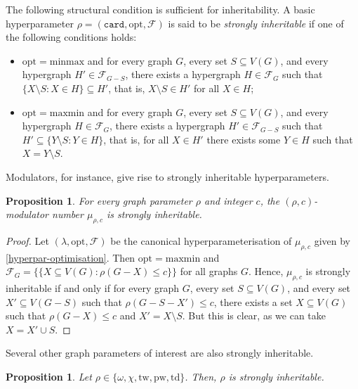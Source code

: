 \documentclass[11pt]{article}
\newcommand{\td}{\mathrm{td}}
\newcommand{\tw}{\mathrm{tw}}
\newcommand{\maxmin}{\mathrm{maxmin}}
\newcommand{\pw}{\mathrm{pw}}
\newcommand{\opt}{\mathrm{opt}}
\newcommand{\rhocm}{\mu_{\rho,c}}
\theoremstyle{plain}
\newtheorem{proposition}[theorem]{Proposition}
\theoremstyle{definition}
\theoremstyle{remark}
\numberwithin{equation}{section}
\begin{document}
The following structural condition is sufficient for inheritability.
A basic hyperparameter $\rho=(\mathtt{card},\opt,\mathcal{F})$ is said to be \emph{strongly inheritable} if one of the following conditions holds:
\begin{itemize}
    \item $\mathrm{opt}= \mathrm{minmax}$ and for every graph $G$, every set $S\subseteq V(G)$, and every hypergraph $H'\in \mathcal{F}_{G-S}$, there exists a hypergraph $H\in \mathcal{F}_{G}$ such that $\{X\setminus S\colon X\in H\} \subseteq H'$, that is, $X\setminus S\in H'$ for all $X\in H$;
    \item $\mathrm{opt}= \mathrm{maxmin}$ and for every graph $G$, every set $S\subseteq V(G)$, and every hypergraph $H\in \mathcal{F}_{G}$, there exists a hypergraph $H'\in \mathcal{F}_{G-S}$ such that $H'\subseteq \{Y\setminus S\colon Y\in H\}$, that is, for all $X\in H'$ there exists some $Y\in H$ such that $X = Y\setminus S$.
\end{itemize}

Modulators, for instance, give rise to strongly inheritable hyperparameters.

\begin{proposition}\label{obs:inheritable-2}
For every graph parameter $\rho$ and integer $c$, the $(\rho,c)$-modulator number $\rhocm$ is strongly inheritable.
\end{proposition}

\begin{proof}
Let $(\lambda, \mathrm{opt}, \mathcal{F})$ be the canonical hyperparameterisation of $\rhocm$ given by \cref{hyperpar-optimisation}.
Then $\opt = \maxmin$ and $\mathcal{F}_G = \big\{\{X\subseteq V(G) \colon \rho(G-X)\le c\}\big\}$ for all graphs $G$.
Hence, $\rhocm$ is strongly inheritable if and only if for every graph $G$, every set $S\subseteq V(G)$, and every set $X'\subseteq V(G-S)$ such that $\rho(G-S-X')\le c$, there exists a set $X\subseteq V(G)$ such that $\rho(G-X)\le c$ and $X' = X\setminus S$.
But this is clear, as we can take $X = X'\cup S$.
\end{proof}

Several other graph parameters of interest are also strongly inheritable. 

\begin{proposition}\label{obs:inheritable}
Let $\rho\in\{\omega,\chi,\tw,\pw,\td\}$.
Then, $\rho$ is strongly inheritable.
\end{proposition}
\end{document}
